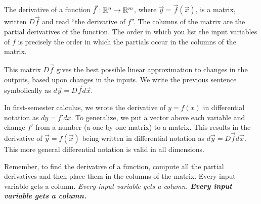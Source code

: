 \begin{problem}
\begin{enumerate}
\end{enumerate}
\end{problem}



\begin{definition}
The derivative of a function $\vec f:\mathbb{R}^n\to \mathbb{R}^m$, where $\vec y=\vec f(\vec x)$, is a matrix, written $D\vec f$ and read ``the derivative of $f$''. The columns of the matrix are the partial derivatives of the function. The order in which you list the input variables of $f$ is precisely the order in which the partials occur in the columns of the matrix.

 This matrix $D\vec f$ gives the best possible linear approximation to changes in the outputs, based upon changes in the inputs. We write the previous sentence symbolically as $d\vec y = D\vec f d\vec x$. 
\end{definition}
In first-semester calculus, we wrote the derivative of $y=f(x)$ in differential notation as $dy=f'dx$.  To generalize, we put a vector above each variable and change $f'$ from a number (a one-by-one matrix) to a matrix. This results in the derivative of $\vec y=f(\vec x)$ being written in differential notation as $d\vec y = D\vec f d\vec x$.  This more general differential notation is valid in all dimensions.

Remember, to find the derivative of a function, compute all the partial derivatives and then place them in the columns of the matrix. Every input variable gets a column. {\it Every input variable gets a column. {\bf Every input variable gets a column.}} 

